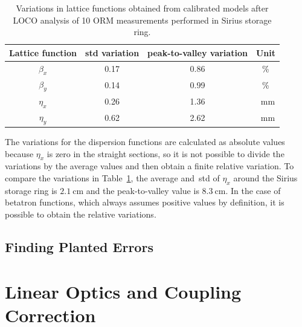\begin{table}
    \centering
    \caption{Variations in lattice functions obtained from calibrated models after LOCO analysis of 10 ORM measurements performed in Sirius storage ring.}
    \label{tab:twiss_var}
    \begin{tabular}{cccc}
        \toprule\toprule
        Lattice function & std variation & peak-to-valley variation & Unit \\
        \hline
        $\beta_x$ & \num{0.17}& \num{0.86} & \%\\
        $\beta_y$ & \num{0.14} & \num{0.99}& \% \\
        $\eta_x$ & \num{0.26} & \num{1.36} & \SI{}{\milli\meter}\\
        $\eta_y$ & \num{0.62} & \num{2.62} & \SI{}{\milli\meter} \\
        \bottomrule\bottomrule
    \end{tabular}
\end{table}

The variations for the dispersion functions are calculated as absolute values because $\eta_x$ is zero in the straight sections, so it is not possible to divide the variations by the average values and then obtain a finite relative variation. To compare the variations in Table~\ref{tab:twiss_var}, the average and~\gls{std} of $\eta_x$ around the Sirius storage ring is $\SI{2.1}{\cm}$ and the peak-to-valley value is $\SI{8.3}{\cm}$. In the case of betatron functions, which always assumes positive values by definition, it is possible to obtain the relative variations.


\subsection{Finding Planted Errors}


\section{Linear Optics and Coupling Correction}

